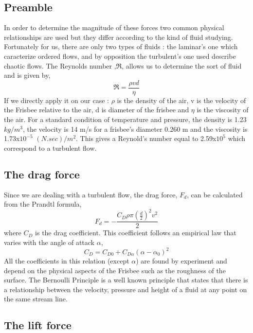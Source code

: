 \documentclass[10pt,a4paper]{report}
\begin{document}
\subsection{Preamble}
In order to determine the magnitude of these forces two common physical relationships are used but they differ according to the kind of fluid studying. Fortunately for us, there are only two types of fluids : the laminar's one which caracterize ordered flows, and by opposition the turbulent's one used describe chaotic flows. The Reynolds number ,$\Re$, allows us to determine the sort of fluid and is given by,
\[\Re = \frac{\rho v d}{\eta}\]
If we directly apply it on our case : $\rho$ is the density of the air, v is the velocity of the Frisbee relative to the air, d is diameter of the frisbee and $\eta$ is the viscosity of the air. For a standard condition of temperature and pressure, the density is 1.23 $kg/m^3$, the velocity is 14 m/s for a frisbee's diameter 0.260 m and the viscosity is 1.73x$10^{-5}$ $(N.sec)/m^2$. This gives a Reynold's number equal to 2.59x$10^5$ which correspond to a turbulent flow.

\subsection{The drag force}

Since we are dealing with a turbulent flow, the drag force, $F_d$, can be calculated from the Prandtl formula,
\[F_d = - \frac{C_D \rho \pi \left(\frac{d}{2}\right)^2 v^2}{2}\]
where $C_D$ is the drag coefficient. This coefficient follows an empirical law\cite{art1} that varies with the angle of attack $\alpha$,
\[C_D = C_{D0} + C_{D\alpha}(\alpha-\alpha_0)^2\]
All the coefficients in this relation (except $\alpha$) are found by experiment and depend on the physical aspects of the Frisbee such as the roughness of the surface.
The Bernoulli Principle is a well known principle that states that there is a relationship between the velocity, pressure and height of a fluid at any point on the same stream line.

\subsection{The lift force}
\end{document}

